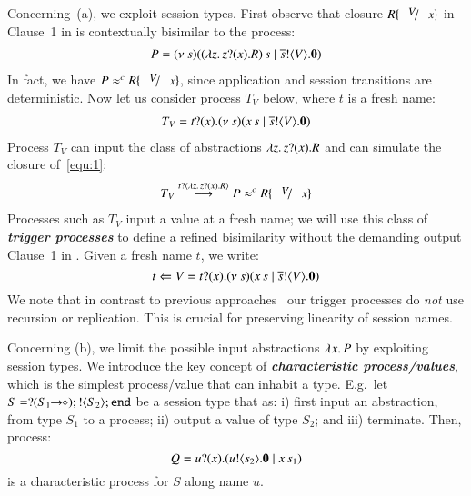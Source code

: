 Concerning~(a), we exploit session types. 
First observe that closure $R\subst{V}{x}$ 
in Clause~1 in 
is contextually bisimilar to the process:
%
\begin{eqnarray}
	\label{equ:1}
	P = (\nu\ s)((\lambda z.\,z ? (x) .{R})\,s \;|\; \overline{s} ! \langle V \rangle . \mathbf{0})
\end{eqnarray}
%
\noi
In fact, we have $P \wbc R\subst{V}{x}$, since 
application and session transitions are deterministic.  
Now let us consider process $T_{V}$ below,
where $t$ is a fresh name:
%
\begin{eqnarray}
	\label{equ:0}
	T_{V} = t ? (x) . (\nu\ s)(x\,s \;|\; \overline{s} ! \langle V \rangle . \mathbf{0})
\end{eqnarray}
%
\noi
Process $T_{V}$ can input the class of
abstractions $\lambda z.\,z ? (x) . R$ and
can simulate the closure of~\ref{equ:1}:%
%
\begin{eqnarray}
	\label{equ:2}
	T_{V} \by{\bactinp{t}{\abs{z}{\binp{z}{x}R}}} P \wbc R \subst{V}{x}
\end{eqnarray}
Processes such as $T_{V}$
input a value at a fresh name;
we will use this class of 
{\bf\em trigger processes} to define a
refined bisimilarity without the demanding 
output Clause~1 in .
Given a fresh name $t$, we write:
%
\[
	t \Leftarrow V = t ? (x) . (\nu\ s)(x\,s \;|\; \overline{s} ! \langle V \rangle . \mathbf{0})
\]
%
We note that in contrast to previous
approaches~\cite{SaWabook,DBLP:journals/lmcs/JeffreyR05} 
our {trigger processes} do {\em not}
use recursion or replication.
This is crucial for preserving linearity of 
session names.



Concerning (b), we limit the possible input abstractions
$\lambda x.\,P$ by exploiting session types.
We introduce the key concept of {\bf \emph{characteristic process/values}},
which is the 
simplest process/value that can inhabit a type.
E.g.~let $S = ? (S_1\!\! \rightarrow\!\! \diamond) ; ! \langle S_2 \rangle ; \mathtt{end}$
be a session type that as:
i) first input an abstraction, from type $S_1$ to a process;
ii) output a value of type $S_2$; and iii) terminate.
Then, process:
%
\[
	Q = u ? (x) . (u ! \langle s_2 \rangle . \mathbf{0} \;|\; x\,s_1)
\]
%
\noi is a characteristic process for $S$ along name $u$.
 
